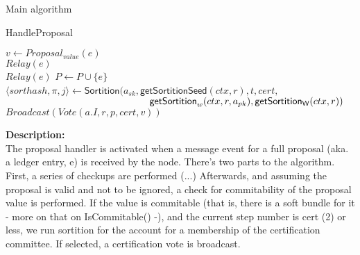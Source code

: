 \documentclass[10pt,a4paper]{article}
\begin{document}
\begin{section}{Main algorithm}


\begin{subsection}{HandleProposal}\label{ssect:HandleProposal}

    \begin{algorithm}[H]
        \begin{algorithmic}[1]

            \State $v \gets Proposal_{value}(e)$ \\

                \State $Relay(e)$
            \EndIf \\

                \State $Relay(e)$
                \State $P \gets P \cup \{e\}$ \\  %

                        \State $\langle sorthash, \pi, j\rangle\gets 
                        \mathsf{Sortition}(
                        a_{sk}, 
                        \mathsf{getSortitionSeed}(ctx, r), 
                        t, 
                        cert, $ \newline
                        ${}$ ${\hskip 5.2cm}\mathsf{getSortition}_w(ctx, r, a_{pk}), 
                        \mathsf{getSortition_W}(ctx, r)
                        )$
                            \State $Broadcast(Vote(a.I, r, p, cert, v))$
                        \EndIf
                    \EndFor    
                \EndIf

            \EndIf

        \EndFunction
        \end{algorithmic}
        \caption{\underline{HandleProposal}}
    \end{algorithm}
    
    
    \noindent \textbf{Description:}\\
The proposal handler is activated when a message event for a full proposal (aka. a ledger entry, e) is received by the node.
There's two parts to the algorithm. First, a series of checkups are performed (...)
Afterwards, and assuming the proposal is valid and not to be ignored, a check for commitability of the proposal value is performed.
If the value is commitable (that is, there is a soft bundle for it - more on that on IsCommitable() -), and the current step number
is cert (2) or less, we run sortition for the account for a membership of the certification committee.
If selected, a certification vote is broadcast.
    

\end{subsection}
\end{section}
\end{document}
